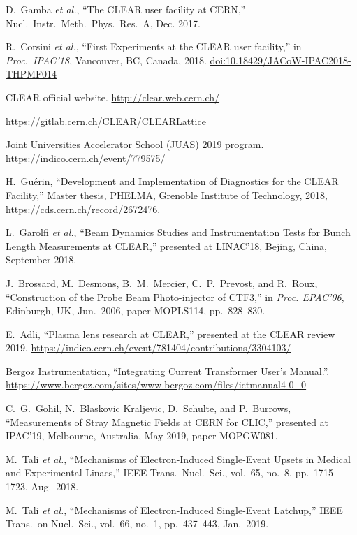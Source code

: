 \documentclass[a4paper,
               keeplastbox,   %
               ]{jacow}
\begin{document}
\begin{thebibliography}{99}
 D.\ Gamba \emph{et al.}, “The CLEAR user facility at CERN,” Nucl.\ Instr.\ Meth.\ Phys.\ Res.\ A, Dec. 2017.

 R.\ Corsini \emph{et al.}, “First Experiments at the CLEAR user facility,” in \emph{Proc.\ IPAC'18}, Vancouver, BC, Canada, 2018. \url{doi:10.18429/JACoW-IPAC2018-THPMF014}

 CLEAR official website. \url{http://clear.web.cern.ch/}

 \url{https://gitlab.cern.ch/CLEAR/CLEARLattice}

 Joint Universities Accelerator School (JUAS) 2019 program. \url{https://indico.cern.ch/event/779575/}

 H.\ Guérin, “Development and Implementation of Diagnostics for the CLEAR Facility,” Master thesis, PHELMA, Grenoble Institute of Technology, 2018, \url{https://cds.cern.ch/record/2672476}.

 L.\ Garolfi \emph{et al.}, “Beam Dynamics Studies and Instrumentation Tests for Bunch Length Measurements at CLEAR,” presented at LINAC'18, Bejing, China, September 2018.

 J.\ Brossard, M.\ Desmons, B.\ M.\ Mercier, C.\ P.\ Prevost, and R.\ Roux, “Construction of the Probe Beam Photo-injector of CTF3,” in \emph{Proc. EPAC'06}, Edinburgh, UK, Jun.\ 2006, paper MOPLS114, pp.\ 828--830.

 E.\ Adli, ``Plasma lens research at CLEAR,'' presented at the CLEAR review 2019. \url{https://indico.cern.ch/event/781404/contributions/3304103/}

 Bergoz Instrumentation, “Integrating Current Transformer User’s Manual.”. \url{https://www.bergoz.com/sites/www.bergoz.com/files/ictmanual4-0_0}

   C.\ G.\ Gohil, N.\ Blaskovic Kraljevic, D.\ Schulte, and P.\ Burrows,
   “Measurements of Stray Magnetic Fields at CERN for CLIC,”
   presented at IPAC'19, Melbourne, Australia, May 2019, paper MOPGW081.

 M.\ Tali \emph{et al.}, “Mechanisms of Electron-Induced Single-Event Upsets in Medical and Experimental Linacs,” IEEE Trans.\ Nucl.\ Sci., vol.\ 65, no.\ 8, pp.\ 1715--1723, Aug.\ 2018.

 M.\ Tali \emph{et al.}, “Mechanisms of Electron-Induced Single-Event Latchup,” IEEE Trans.\ on Nucl.\ Sci., vol.\ 66, no.\ 1, pp.\ 437--443, Jan.\ 2019.


\end{thebibliography}
\end{document}
